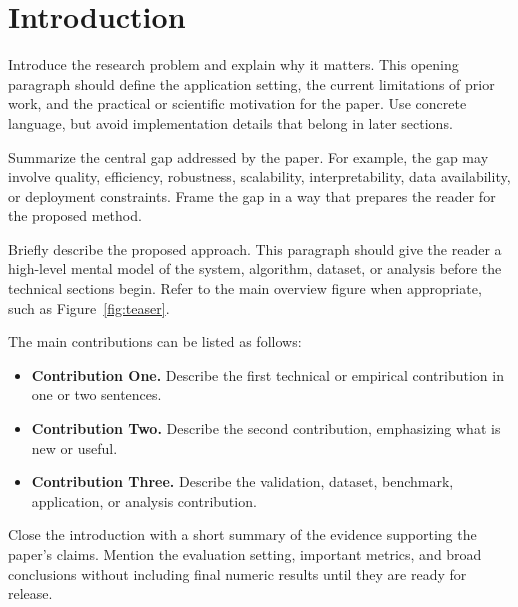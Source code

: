 \section{Introduction}

Introduce the research problem and explain why it matters.
This opening paragraph should define the application setting, the current limitations of prior work, and the practical or scientific motivation for the paper.
Use concrete language, but avoid implementation details that belong in later sections.

Summarize the central gap addressed by the paper.
For example, the gap may involve quality, efficiency, robustness, scalability, interpretability, data availability, or deployment constraints.
Frame the gap in a way that prepares the reader for the proposed method.

Briefly describe the proposed approach.
This paragraph should give the reader a high-level mental model of the system, algorithm, dataset, or analysis before the technical sections begin.
Refer to the main overview figure when appropriate, such as Figure~\ref{fig:teaser}.

The main contributions can be listed as follows:
\begin{itemize}
    \item \textbf{Contribution One.} Describe the first technical or empirical contribution in one or two sentences.
    \item \textbf{Contribution Two.} Describe the second contribution, emphasizing what is new or useful.
    \item \textbf{Contribution Three.} Describe the validation, dataset, benchmark, application, or analysis contribution.
\end{itemize}

Close the introduction with a short summary of the evidence supporting the paper's claims.
Mention the evaluation setting, important metrics, and broad conclusions without including final numeric results until they are ready for release.

\newpage
